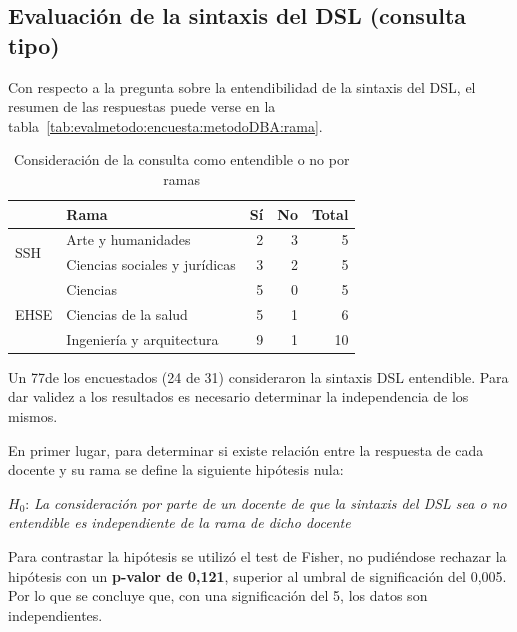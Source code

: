 \subsection{Evaluación de la sintaxis del DSL (consulta tipo)}

Con respecto a la pregunta sobre la entendibilidad de la sintaxis del DSL, el resumen de las respuestas puede verse en la tabla~\ref{tab:evalmetodo:encuesta:metodoDBA:rama}.

\begin{table}[H]
  \begin{center}
  \begin{tabular}{| l | l | r | r | r |}
    \hline
    & Rama & Sí & No & Total \\
    \hline
    \hline
    \multirow{2}{2.5cm}{SSH} & Arte y humanidades & 2 & 3 & 5  \\
    \cline{2-5}
    & Ciencias sociales y jurídicas & 3 & 2 & 5  \\
    \hline
    \multirow{3}{2.5cm}{EHSE} & Ciencias & 5 & 0 & 5  \\
    \cline{2-5}
    & Ciencias de la salud & 5 & 1 & 6  \\
    \cline{2-5}
    & Ingeniería y arquitectura & 9 & 1 & 10 \\
    \hline
  \end{tabular}
\end{center}
\caption{Consideración de la consulta como entendible o no por ramas}
\label{tab:evalmetodo:encuesta:consulta:rama}
\end{table}

Un 77\percentage{ }de los encuestados (24 de 31) consideraron la sintaxis DSL entendible. Para dar validez a los resultados es necesario determinar la independencia de los mismos.

En primer lugar, para determinar si existe relación entre la respuesta de cada docente y su rama se define la siguiente hipótesis nula:

\medskip
\begin{mdframed}[style=hipotesis0]
$H_0$: \emph{La consideración por parte de un docente de que la sintaxis del DSL sea o no entendible es independiente de la rama de dicho docente}
\end{mdframed}

\medskip
Para contrastar la hipótesis se utilizó el test de Fisher, no pudiéndose rechazar la hipótesis con un \textbf{p-valor de 0,121}, superior al umbral de significación del 0,005. Por lo que se concluye que, con una significación del 5\percentage, los datos son independientes.


